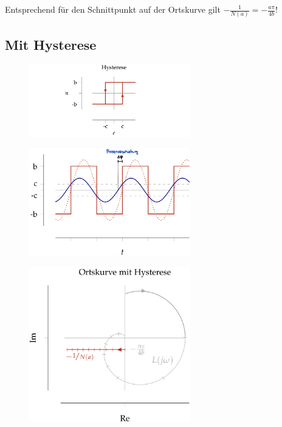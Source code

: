 \documentclass[
  10pt,
  a4paper,
  twocolumn]{article}
\numberwithin{equation}{section}
\begin{document}
Entsprechend für den Schnittpunkt auf der Ortskurve gilt
\(-\frac1{N(a)}=-\frac{a\pi}{4b}\)!

\hypertarget{mit-hysterese}{%
\subsection{Mit Hysterese}\label{mit-hysterese}}

\begin{figure}[H]

{\centering \includegraphics[width=7cm,height=\textheight]{images/paste-50.png}

}

\end{figure}

\begin{figure}[H]

{\centering \includegraphics[width=7cm,height=\textheight]{images/paste-48.png}

}

\end{figure}

\begin{figure}[H]

{\centering \includegraphics[width=7cm,height=\textheight]{images/paste-51.png}

}

\end{figure}
\end{document}
